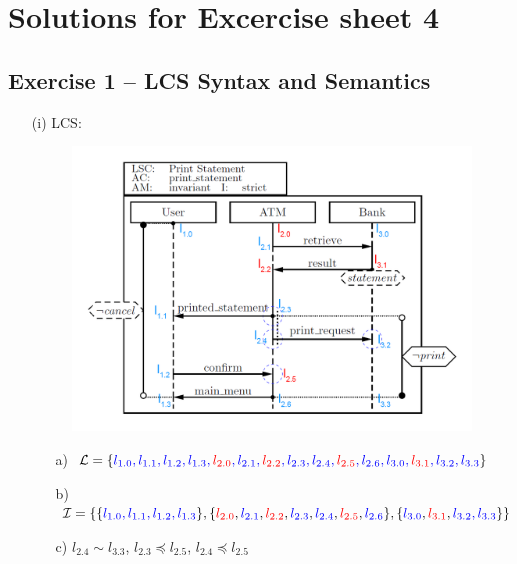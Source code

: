 \documentclass{scrartcl}
\begin{document}
\section*{Solutions for Excercise sheet 4}

\subsection*{Exercise 1 – LCS Syntax and Semantics}

\begin{itemize}
    \item[(i)] LCS:
    \begin{figure}[h]
        \centering
        \includegraphics[width=\textwidth]{lcs.png}
    \end{figure}
    \begin{itemize}
        \item[a)] $\mathcal{L} = \{
            {\color{blue} l_{1.0}, l_{1.1}, l_{1.2}, l_{1.3},
            {\color{red} l_{2.0}}, l_{2.1}, {\color{red} l_{2.2}}, l_{2.3}, l_{2.4}, {\color{red} l_{2.5} }, l_{2.6},
            l_{3.0}, {\color{red} l_{3.1}}, l_{3.2}, l_{3.3}} \}$
        \item[b)] $ \mathcal{I} = \{
                        \{ {\color{blue} l_{1.0}, l_{1.1}, l_{1.2}, l_{1.3}} \},
                        \{ {\color{red} l_{2.0}}, {\color{blue} l_{2.1}}, {\color{red} l_{2.2}}, {\color{blue} l_{2.3}}, {\color{blue} l_{2.4}}, {\color{red} l_{2.5} }, {\color{blue} l_{2.6} } \},
                        \{ {\color{blue} l_{3.0} }, {\color{red} l_{3.1}},  {\color{blue} l_{3.2}, l_{3.3} } \}
                     \} $
        \item[c)] $ l_{2.4} \sim l_{3.3} $, $ l_{2.3} \preceq l_{2.5} $, $ l_{2.4} \preceq l_{2.5} $

\end{itemize}
\end{itemize}
\end{document}
